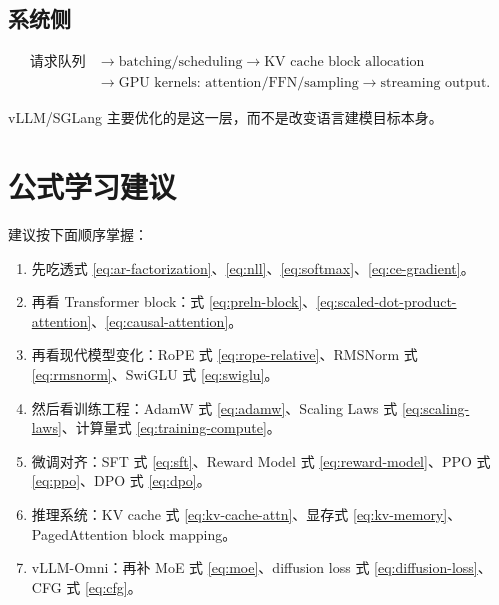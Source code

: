 \documentclass[UTF8,12pt]{ctexart}
\newcommand{\1}{\mathbf{1}}
\begin{document}
\subsection{系统侧}

\[
\begin{aligned}
\text{请求队列}
&\rightarrow
\text{batching/scheduling}
\rightarrow
\text{KV cache block allocation}\\
&\rightarrow
\text{GPU kernels: attention/FFN/sampling}
\rightarrow
\text{streaming output}.
\end{aligned}
\]

vLLM/SGLang 主要优化的是这一层，而不是改变语言建模目标本身。

\section{公式学习建议}

建议按下面顺序掌握：

\begin{enumerate}
  \item 先吃透式 \eqref{eq:ar-factorization}、\eqref{eq:nll}、\eqref{eq:softmax}、\eqref{eq:ce-gradient}。
  \item 再看 Transformer block：式 \eqref{eq:preln-block}、\eqref{eq:scaled-dot-product-attention}、\eqref{eq:causal-attention}。
  \item 再看现代模型变化：RoPE 式 \eqref{eq:rope-relative}、RMSNorm 式 \eqref{eq:rmsnorm}、SwiGLU 式 \eqref{eq:swiglu}。
  \item 然后看训练工程：AdamW 式 \eqref{eq:adamw}、Scaling Laws 式 \eqref{eq:scaling-laws}、计算量式 \eqref{eq:training-compute}。
  \item 微调对齐：SFT 式 \eqref{eq:sft}、Reward Model 式 \eqref{eq:reward-model}、PPO 式 \eqref{eq:ppo}、DPO 式 \eqref{eq:dpo}。
  \item 推理系统：KV cache 式 \eqref{eq:kv-cache-attn}、显存式 \eqref{eq:kv-memory}、PagedAttention block mapping。
  \item vLLM-Omni：再补 MoE 式 \eqref{eq:moe}、diffusion loss 式 \eqref{eq:diffusion-loss}、CFG 式 \eqref{eq:cfg}。
\end{enumerate}
\end{document}
